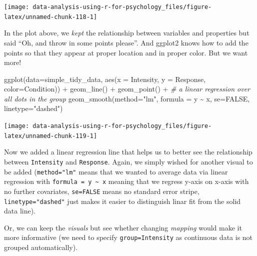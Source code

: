 \documentclass[
]{book}
\newenvironment{Shaded}{\begin{snugshade}}{\end{snugshade}}
\newcommand{\AttributeTok}[1]{\textcolor[rgb]{0.77,0.63,0.00}{#1}}
\newcommand{\CommentTok}[1]{\textcolor[rgb]{0.56,0.35,0.01}{\textit{#1}}}
\newcommand{\ConstantTok}[1]{\textcolor[rgb]{0.00,0.00,0.00}{#1}}
\newcommand{\FunctionTok}[1]{\textcolor[rgb]{0.00,0.00,0.00}{#1}}
\newcommand{\NormalTok}[1]{#1}
\newcommand{\SpecialCharTok}[1]{\textcolor[rgb]{0.00,0.00,0.00}{#1}}
\newcommand{\StringTok}[1]{\textcolor[rgb]{0.31,0.60,0.02}{#1}}
\begin{document}
\begin{center}\texttt{[image: data-analysis-using-r-for-psychology\_files/figure-latex/unnamed-chunk-118-1]} \end{center}

In the plot above, we \emph{kept} the relationship between variables and properties but said ``Oh, and throw in some points please''. And ggplot2 knows how to add the points so that they appear at proper location and in proper color. But we want more!

\begin{Shaded}
\begin{Highlighting}[]
\FunctionTok{ggplot}\NormalTok{(}\AttributeTok{data=}\NormalTok{simple\_tidy\_data, }\FunctionTok{aes}\NormalTok{(}\AttributeTok{x =}\NormalTok{ Intensity, }\AttributeTok{y =}\NormalTok{ Response, }\AttributeTok{color=}\NormalTok{Condition)) }\SpecialCharTok{+} 
  \FunctionTok{geom\_line}\NormalTok{() }\SpecialCharTok{+}
  \FunctionTok{geom\_point}\NormalTok{() }\SpecialCharTok{+}
  \CommentTok{\# a linear regression over all dots in the group}
  \FunctionTok{geom\_smooth}\NormalTok{(}\AttributeTok{method=}\StringTok{"lm"}\NormalTok{, }\AttributeTok{formula =}\NormalTok{ y }\SpecialCharTok{\textasciitilde{}}\NormalTok{ x, }\AttributeTok{se=}\ConstantTok{FALSE}\NormalTok{, }\AttributeTok{linetype=}\StringTok{"dashed"}\NormalTok{) }
\end{Highlighting}
\end{Shaded}

\begin{center}\texttt{[image: data-analysis-using-r-for-psychology\_files/figure-latex/unnamed-chunk-119-1]} \end{center}

Now we added a linear regression line that helps us to better see the relationship between \texttt{Intensity} and \texttt{Response}. Again, we simply wished for another visual to be added (\texttt{method="lm"} means that we wanted to average data via linear regression with \texttt{formula\ =\ y\ \textasciitilde{}\ x} meaning that we regress y-axis on x-axis with no further covariates, \texttt{se=FALSE} means no standard error stripe, \texttt{linetype="dashed"} just makes it easier to distinguish linar fit from the solid data line).

Or, we can keep the \emph{visuals} but see whether changing \emph{mapping} would make it more informative (we need to specify \texttt{group=Intensity} as continuous data is not grouped automatically).
\end{document}
